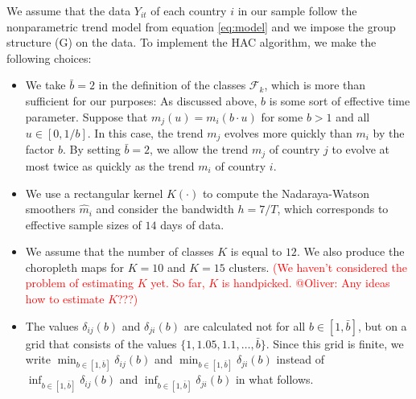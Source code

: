 \documentclass[a4paper,12pt]{article}
\numberwithin{equation}{section}
\begin{document}
We assume that the data $Y_{it}$ of each country $i$ in our sample follow the nonparametric trend model from equation \eqref{eq:model} and we impose the group structure (G) on the data. 
To implement the HAC algorithm, we make the following choices:
\begin{itemize}[leftmargin=0.6cm]
\item We take $\bar{b} = 2$ in the definition of the classes $\mathcal{F}_k$, which is more than sufficient for our purposes: As discussed above, $b$ is some sort of effective time parameter. Suppose that $m_j(u) = m_i(b \cdot u)$ for some $b > 1$ and all $u \in [0,1/b]$. In this case, the trend $m_j$ evolves more quickly than $m_i$ by the factor $b$. By setting $\bar{b} = 2$, we allow the trend $m_j$ of country $j$ to evolve at most twice as quickly as the trend $m_i$ of country $i$.  
\item We use a rectangular kernel $K(\cdot)$ to compute the Nadaraya-Watson smoothers $\hat{m}_{i}$ and consider the bandwidth $h = 7/T$, which corresponds to effective sample sizes of $14$ days of data. 
\item We assume that the number of classes $K$ is equal to $12$. We also produce the choropleth maps for $K=10$ and $K = 15$ clusters. \textcolor{red}{(We haven't considered the problem of estimating $K$ yet. So far, $K$ is handpicked. @Oliver: Any ideas how to estimate $K$???)}
\item The values $\delta_{ij}(b)$ and $\delta_{ji}(b)$ are calculated not for all $b\in [1, \bar{b}]$, but on a grid that consists of the values $\{1, 1.05, 1.1, \ldots, \bar{b}\}$. Since this grid is finite, we write $\min_{b \in [1, \bar{b}]} \delta_{ij}(b)$ and $\min_{b \in [1, \bar{b}]} \delta_{ji}(b)$ instead of $\inf_{b \in [1, \bar{b}]} \delta_{ij}(b)$ and $\inf_{b \in [1, \bar{b}]} \delta_{ji}(b)$ in what follows.
\end{itemize}
\end{document}
